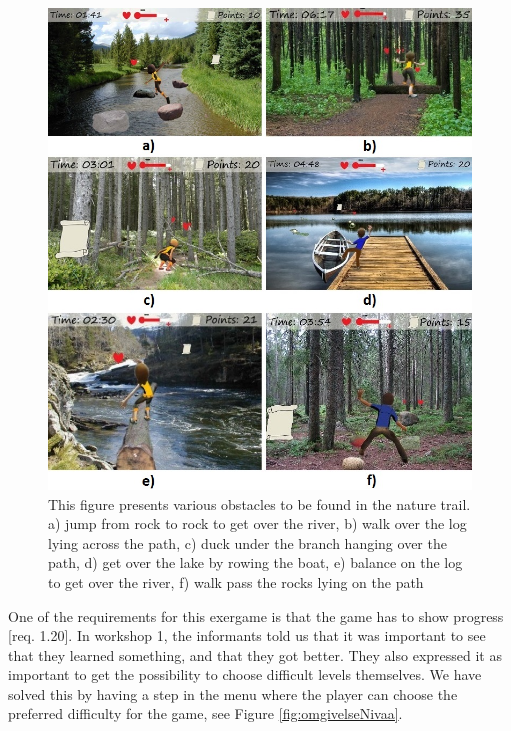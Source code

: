 \begin{figure} [H]
\centering
\includegraphics[scale=0.57]{hindringerEng.jpg}
\caption[Nature trail - obstacles]{This figure presents various obstacles to be found in the nature trail. a) jump from rock to rock to get over the river, b) walk over the log lying across the path, c) duck under the branch hanging over the path, d) get over the lake by rowing the boat, e) balance on the log to get over the river, f) walk pass the rocks lying on the path}
\label{fig:hindring}
\end{figure}

One of the requirements for this exergame is that the game has to show progress [req. 1.20]. In workshop 1, the informants told us that it was important to see that they learned something, and that they got better. They also expressed it as important to get the possibility to choose difficult levels themselves. We have solved this by having a step in the menu where the player can choose the preferred difficulty for the game, see Figure \ref{fig:omgivelseNivaa}. 

